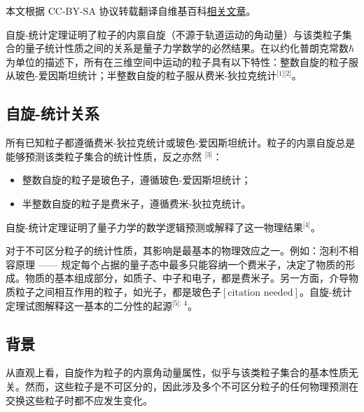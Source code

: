 
本文根据 CC-BY-SA 协议转载翻译自维基百科\href{https://en.wikipedia.org/wiki/Spin\%E2\%80\%93statistics_theorem}{相关文章}。

自旋-统计定理证明了粒子的内禀自旋（不源于轨道运动的角动量）与该类粒子集合的量子统计性质之间的关系是量子力学数学的必然结果。在以约化普朗克常数\( \hbar \)为单位的描述下，所有在三维空间中运动的粒子具有以下特性：整数自旋的粒子服从玻色-爱因斯坦统计；半整数自旋的粒子服从费米-狄拉克统计\(^\text{[1][2]}\)。
\subsection{自旋-统计关系} 
所有已知粒子都遵循费米-狄拉克统计或玻色-爱因斯坦统计。粒子的内禀自旋总是能够预测该类粒子集合的统计性质，反之亦然 \(^\text{[3]}\)：  
\begin{itemize}
\item 整数自旋的粒子是玻色子，遵循玻色-爱因斯坦统计；  
\item 半整数自旋的粒子是费米子，遵循费米-狄拉克统计。  
\end{itemize}
自旋-统计定理证明了量子力学的数学逻辑预测或解释了这一物理结果\(^\text{[4]}\)。  

对于不可区分粒子的统计性质，其影响是最基本的物理效应之一。例如：泡利不相容原理 —— 规定每个占据的量子态中最多只能容纳一个费米子，决定了物质的形成。物质的基本组成部分，如质子、中子和电子，都是费米子。另一方面，介导物质粒子之间相互作用的粒子，如光子，都是玻色子\([\text{citation needed}]\)。自旋-统计定理试图解释这一基本的二分性的起源\(^\text{[5]: 4}\)。
\subsection{背景}
从直观上看，自旋作为粒子的内禀角动量属性，似乎与该类粒子集合的基本性质无关。然而，这些粒子是不可区分的，因此涉及多个不可区分粒子的任何物理预测在交换这些粒子时都不应发生变化。
